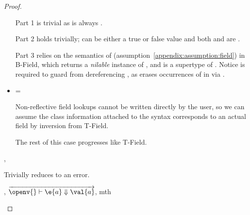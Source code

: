 \begin{lemma}
\begin{proof}
\begin{case}[B-Field]
\begin{itemize}
\begin{subcase}[T-Field]
Part 1 is trivial as \object{} is always \emptyobject{}.

Part 2 holds trivially; \val{} can be either a true or false value
and both {\thenprop{\prop{}}} and {\elseprop{\prop{}}}
are \topprop{}.

Part 3 relies on the semantics of \getfieldliteral (assumption~\ref{appendix:assumption:field})
in B-Field, which returns a \emph{nilable} instance of ,
and \ty{} is a supertype of .
Notice \issubtypein{}{\s{}}{\Object{}} is required to guard from dereferencing \nil{},
as {} erases occurrences of \Nil{} in \s{} via  .
\end{subcase}
  \item[]

\begin{subcase}[T-FieldStatic]
  {\ep{}} = { {} {\fld{}} {}}

  Non-reflective field lookups cannot be written directly by the user, so we can assume
  the class information attached to the syntax corresponds to an actual field by inversion
  from T-Field.

  The rest of this case progresses like T-Field.
\end{subcase}

\end{itemize}
\end{case}

\begin{case}[BE-Field]
  \opsem {\openv{}}
         {} 
         {\errorvalv{}},
  \opsem {\openv{}}
         {\e{}}
         {\errorvalv{}}

         Trivially reduces to an error.

\end{case}

\begin{case}[B-Method]
  \opsem {\openv{}}
         {}
         {},
  $\overrightarrow{
  \opsem {\openv{}}
         {\e{a}}
         {\val{a}}}$,
   {} {mth}
                    {} {}
                    {}
                    {\val{}}


\end{case}
\end{proof}
\end{lemma}
